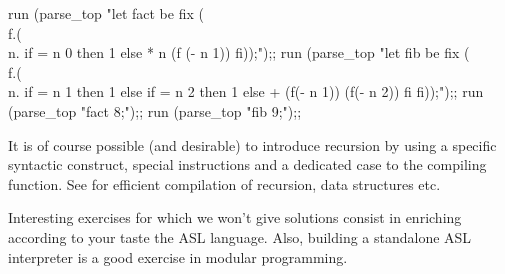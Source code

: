 %
\begin{caml_example}
run (parse_top
    "let fact be fix (\\f.(\\n. if = n 0 then 1
                           else * n (f (- n 1))
                           fi));");;
run (parse_top
  "let fib be fix (\\f.(\\n. if = n 1 then 1
                             else if = n 2 then 1
                                  else + (f(- n 1)) (f(- n 2))
                                  fi
                             fi));");;
run (parse_top "fact 8;");;
run (parse_top "fib 9;");;
\end{caml_example}

It is of course possible (and desirable) to introduce recursion by
using a specific syntactic construct, special instructions and a
dedicated case to the compiling function. See \cite{MaunyConfLisp} for
efficient compilation of recursion, data structures etc.

\begin{exo}
Interesting exercises for which we won't give solutions consist in
enriching according to your taste the ASL language. Also, building a
standalone ASL interpreter is a good exercise in modular programming.
\end{exo}
